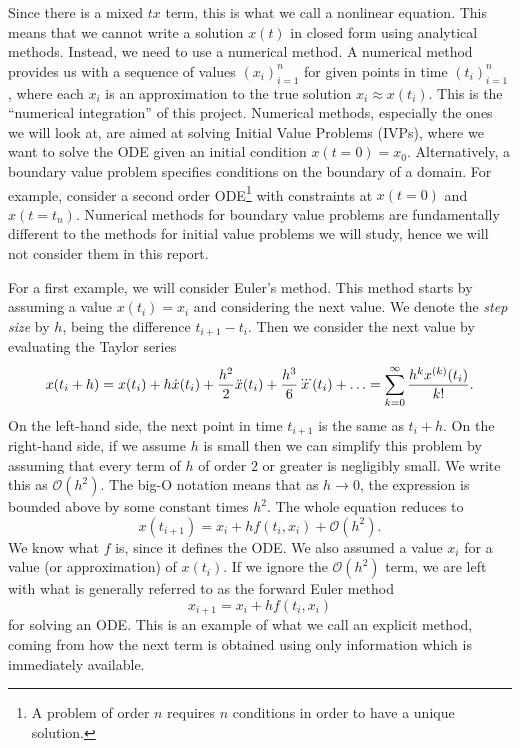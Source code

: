 \documentclass{report}
\theoremstyle{exampstyle} \newtheorem{example}[theorem]{Example}
\theoremstyle{exampstyle} \newtheorem{remark}[theorem]{Remark}
\theoremstyle{exampstyle} \newtheorem{definition}[theorem]{Definition}
\theoremstyle{exampstyle} \newtheorem{lemma}[theorem]{Lemma}
\begin{document}
Since there is a mixed $tx$ term, this is what we call a nonlinear equation.
This means that we cannot write a solution $x(t)$ in closed form using analytical methods.
Instead, we need to use a numerical method.
A numerical method provides us with a sequence of values $(x_i)_{i=1}^n$ for given points in time $(t_i)_{i=1}^n$, where each $x_i$ is an approximation to the true solution $x_i \approx x(t_i)$.
This is the ``numerical integration'' of this project.
Numerical methods, especially the ones we will look at, are aimed at solving Initial Value Problems (IVPs), where we want to solve the ODE given an initial condition $x(t=0) = x_0$.
Alternatively, a boundary value problem specifies conditions on the boundary of a domain. For example, consider a second order ODE\footnote{
    A problem of order $n$ requires $n$ conditions in order to have a unique solution.
} with constraints at $x(t=0)$ and $x(t = t_n)$.
Numerical methods for boundary value problems are fundamentally different to the methods for initial value problems we will study, hence we will not consider them in this report.

For a first example, we will consider Euler's method. This method starts by assuming a value $x(t_i) = x_i$ and considering the next value.
We denote the \textit{step size} by $h$, being the difference $t_{i+1} - t_i$.
Then we consider the next value by evaluating the Taylor series
\begin{equation*}
    x(t_i + h) = x(t_i) + h \dot{x}(t_i) + \frac{h^2}{2}\ddot{x}(t_i) + \frac{h^3}{6}\dddot{x}(t_i) + \mathellipsis = \sum_{k=0}^{\infty} \frac{h^k x^{(k)}(t_i)}{k!}.
\end{equation*}
On the left-hand side, the next point in time $t_{i+1}$ is the same as $t_i + h$.
On the right-hand side, if we assume $h$ is small then we can simplify this problem by assuming that every term of $h$ of order $2$ or greater is negligibly small.
We write this as $\mathcal{O}(h^2)$. The big-O notation means that as $h \rightarrow 0$, the expression is bounded above by some constant times $h^2$.
The whole equation reduces to
\begin{equation*}
    x(t_{i+1}) = x_i + hf(t_i, x_i) + \mathcal{O}(h^2).
\end{equation*}
We know what $f$ is, since it defines the ODE. We also assumed a value $x_i$ for a value (or approximation) of $x(t_i)$.
If we ignore the $\mathcal{O}(h^2)$ term, we are left with what is generally referred to as the forward Euler method
\begin{equation}
    x_{i+1} = x_i + h f(t_i, x_i)
\end{equation}
for solving an ODE.
This is an example of what we call an explicit method, coming from how the next term is obtained using only information which is immediately available.
\end{document}
